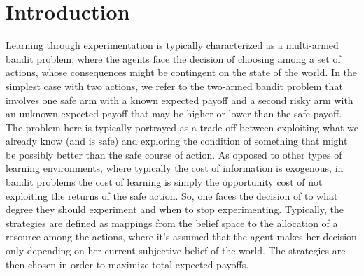 \section*{Introduction}
Learning through experimentation is typically characterized as a multi-armed bandit problem, where the agents face the decision of choosing among a set of actions, whose consequences might be contingent on the state of the world. In the simplest case with two actions, we refer to the two-armed bandit problem that involves one safe arm with a known expected payoff and a second risky arm with an unknown expected payoff that may be higher or lower than the safe payoff. The problem here is typically portrayed as a trade off between exploiting what we already know (and is safe) and exploring the condition of something that might be possibly better than the safe course of action. As opposed to other types of learning environments, where typically the cost of information is exogenous, in bandit problems the cost of learning is simply the opportunity cost of not exploiting the returns of the safe action. So, one faces the decision of to what degree they should experiment and when to stop experimenting. Typically, the strategies are defined as mappings from the belief space to the allocation of a resource among the actions, where it's assumed that the agent makes her decision only depending on her current subjective belief of the world. The strategies are then chosen in order to maximize total expected payoffs.

